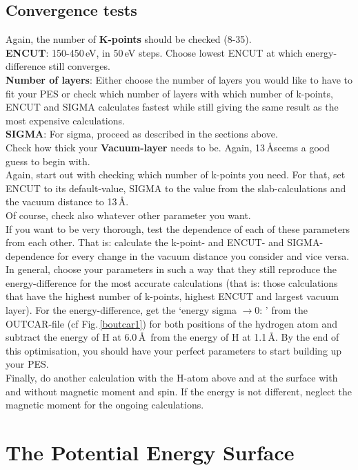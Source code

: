 \documentclass[11pt,oneside,a4paper, captions=nooneline, headsepline]{article}%
\begin{document}
\subsection{Convergence tests}
Again, the number of \textbf{K-points} should be checked (8-35).\\
\textbf{ENCUT}: 150-450\,eV, in 50\,eV steps. Choose lowest ENCUT at which energy-difference still converges.\\
\textbf{Number of layers}: Either choose the number of layers you would like to have to fit your PES or check which number of layers with which number of k-points, ENCUT and SIGMA calculates fastest while still giving the same result as the most expensive calculations.\\
\textbf{SIGMA}: For sigma, proceed as described in the sections above.\\
Check how thick your \textbf{Vacuum-layer} needs to be. Again, 13\,\AA seems a good guess to begin with.\\
Again, start out with checking which number of k-points you need. For that, set ENCUT to its default-value, SIGMA to the value from the slab-calculations and the vacuum distance to 13\,\AA.\\
Of course, check also whatever other parameter you want.\\
If you want to be very thorough, test the dependence of each of these parameters from each other. That is: calculate the k-point- and ENCUT- and SIGMA-dependence for every change in the vacuum distance you consider and vice versa.\\
In general, choose your parameters in such a way that they still reproduce the energy-difference for the most accurate calculations (that is: those calculations that have the highest number of k-points, highest ENCUT and largest vacuum layer). For the energy-difference, get the `energy sigma $\rightarrow 0$: ' from the OUTCAR-file (cf Fig.\,\ref{boutcar1}) for both positions of the hydrogen atom and subtract the energy of H at 6.0\,\AA~from the energy of H at 1.1\,\AA.
By the end of this optimisation, you should have your perfect parameters to start building up your PES.\\
Finally, do another calculation with the H-atom above and at the surface with and without magnetic moment and spin. If the energy is not different, neglect the magnetic moment for the ongoing calculations.\\

\section{The Potential Energy Surface}
\end{document}
